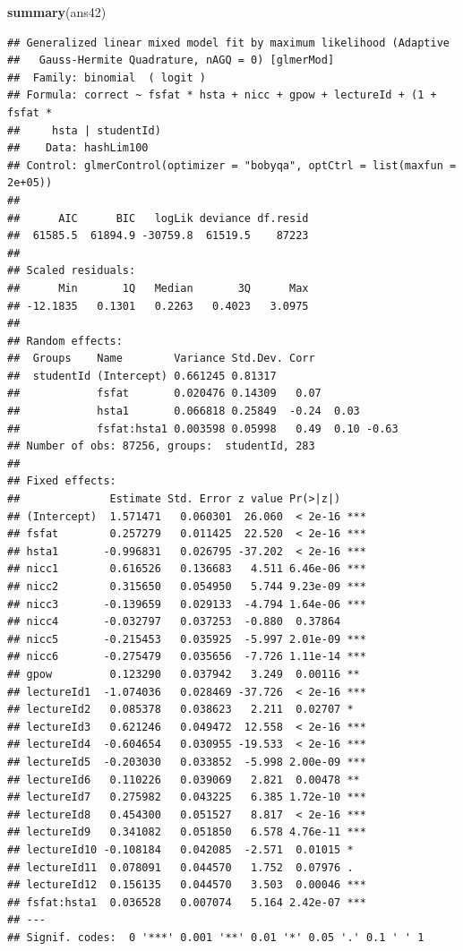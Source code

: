 \documentclass[
]{article}
\newenvironment{Shaded}{\begin{snugshade}}{\end{snugshade}}
\newcommand{\KeywordTok}[1]{\textcolor[rgb]{0.13,0.29,0.53}{\textbf{#1}}}
\newcommand{\NormalTok}[1]{#1}
\begin{document}
\begin{Shaded}
\begin{Highlighting}[]
\KeywordTok{summary}\NormalTok{(ans42)}
\end{Highlighting}
\end{Shaded}

\begin{verbatim}
## Generalized linear mixed model fit by maximum likelihood (Adaptive
##   Gauss-Hermite Quadrature, nAGQ = 0) [glmerMod]
##  Family: binomial  ( logit )
## Formula: correct ~ fsfat * hsta + nicc + gpow + lectureId + (1 + fsfat *  
##     hsta | studentId)
##    Data: hashLim100
## Control: glmerControl(optimizer = "bobyqa", optCtrl = list(maxfun = 2e+05))
## 
##      AIC      BIC   logLik deviance df.resid 
##  61585.5  61894.9 -30759.8  61519.5    87223 
## 
## Scaled residuals: 
##      Min       1Q   Median       3Q      Max 
## -12.1835   0.1301   0.2263   0.4023   3.0975 
## 
## Random effects:
##  Groups    Name        Variance Std.Dev. Corr             
##  studentId (Intercept) 0.661245 0.81317                   
##            fsfat       0.020476 0.14309   0.07            
##            hsta1       0.066818 0.25849  -0.24  0.03      
##            fsfat:hsta1 0.003598 0.05998   0.49  0.10 -0.63
## Number of obs: 87256, groups:  studentId, 283
## 
## Fixed effects:
##              Estimate Std. Error z value Pr(>|z|)    
## (Intercept)  1.571471   0.060301  26.060  < 2e-16 ***
## fsfat        0.257279   0.011425  22.520  < 2e-16 ***
## hsta1       -0.996831   0.026795 -37.202  < 2e-16 ***
## nicc1        0.616526   0.136683   4.511 6.46e-06 ***
## nicc2        0.315650   0.054950   5.744 9.23e-09 ***
## nicc3       -0.139659   0.029133  -4.794 1.64e-06 ***
## nicc4       -0.032797   0.037253  -0.880  0.37864    
## nicc5       -0.215453   0.035925  -5.997 2.01e-09 ***
## nicc6       -0.275479   0.035656  -7.726 1.11e-14 ***
## gpow         0.123290   0.037942   3.249  0.00116 ** 
## lectureId1  -1.074036   0.028469 -37.726  < 2e-16 ***
## lectureId2   0.085378   0.038623   2.211  0.02707 *  
## lectureId3   0.621246   0.049472  12.558  < 2e-16 ***
## lectureId4  -0.604654   0.030955 -19.533  < 2e-16 ***
## lectureId5  -0.203030   0.033852  -5.998 2.00e-09 ***
## lectureId6   0.110226   0.039069   2.821  0.00478 ** 
## lectureId7   0.275982   0.043225   6.385 1.72e-10 ***
## lectureId8   0.454300   0.051527   8.817  < 2e-16 ***
## lectureId9   0.341082   0.051850   6.578 4.76e-11 ***
## lectureId10 -0.108184   0.042085  -2.571  0.01015 *  
## lectureId11  0.078091   0.044570   1.752  0.07976 .  
## lectureId12  0.156135   0.044570   3.503  0.00046 ***
## fsfat:hsta1  0.036528   0.007074   5.164 2.42e-07 ***
## ---
## Signif. codes:  0 '***' 0.001 '**' 0.01 '*' 0.05 '.' 0.1 ' ' 1
\end{verbatim}
\end{document}
